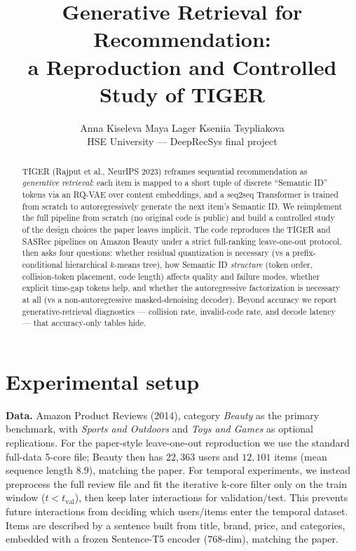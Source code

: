 \documentclass[10pt]{article}
\title{\vspace{-2.5em}\textbf{Generative Retrieval for Recommendation:\\
a Reproduction and Controlled Study of TIGER}}
\author{Anna Kiseleva \quad Maya Lager \quad Kseniia Tsypliakova\\
\normalsize HSE University --- DeepRecSys final project}
\date{\vspace{-1em}}
\begin{document}
\maketitle
\vspace{-1.5em}

\begin{abstract}
\noindent
TIGER (Rajput et al., NeurIPS 2023) reframes sequential recommendation as
\emph{generative retrieval}: each item is mapped to a short tuple of discrete
``Semantic ID'' tokens via an RQ-VAE over content embeddings, and a seq2seq
Transformer is trained from scratch to autoregressively generate the next item's
Semantic ID. We reimplement the full pipeline from scratch (no original code is
public) and build a controlled study of the design choices the paper leaves
implicit. The code reproduces the TIGER and SASRec pipelines on Amazon Beauty
under a strict full-ranking leave-one-out protocol, then asks four questions:
whether residual quantization is necessary (vs a prefix-conditional hierarchical
$k$-means tree), how Semantic ID
\emph{structure} (token order, collision-token placement, code length) affects
quality and failure modes, whether explicit time-gap tokens help, and whether the
autoregressive factorization is necessary at all (vs a non-autoregressive
masked-denoising decoder). Beyond accuracy we report generative-retrieval
diagnostics --- collision rate, invalid-code rate, and decode latency --- that
accuracy-only tables hide.
\end{abstract}

\vspace{-0.5em}
\section{Experimental setup}

\textbf{Data.} Amazon Product Reviews (2014), category \emph{Beauty} as the
primary benchmark, with \emph{Sports and Outdoors} and \emph{Toys and Games} as
optional replications. For the paper-style leave-one-out reproduction we use the
standard full-data 5-core file; Beauty then has $22{,}363$ users and $12{,}101$
items (mean sequence length $8.9$), matching the paper. For temporal
experiments, we instead preprocess the full review file and fit the iterative
k-core filter only on the train window ($t< t_{\mathrm{val}}$), then keep later
interactions for validation/test. This prevents future interactions from
deciding which users/items enter the temporal dataset. Items are described by a
sentence built from title, brand, price, and categories, embedded with a frozen
Sentence-T5 encoder ($768$-dim), matching the paper.
\end{document}
